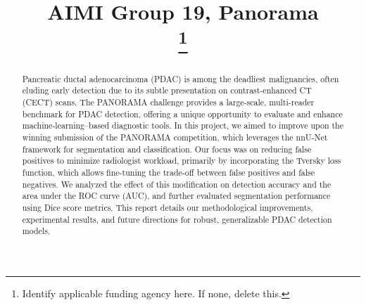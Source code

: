 \documentclass[conference]{IEEEtran}
\begin{document}
\title{AIMI Group 19, Panorama\\
\thanks{Identify applicable funding agency here. If none, delete this.}
}

\author{
\and
{}
\and
{}
\and
{}
}

\maketitle

\begin{abstract}
Pancreatic ductal adenocarcinoma (PDAC) is among the deadliest malignancies, often eluding early detection due to its subtle presentation on contrast-enhanced CT (CECT) scans. The PANORAMA challenge provides a large-scale, multi-reader benchmark for PDAC detection, offering a unique opportunity to evaluate and enhance machine-learning–based diagnostic tools. In this project, we aimed to improve upon the winning submission of the PANORAMA competition, which leverages the nnU-Net framework for segmentation and classification. Our focus was on reducing false positives to minimize radiologist workload, primarily by incorporating the Tversky loss function, which allows fine-tuning the trade-off between false positives and false negatives. We analyzed the effect of this modification on detection accuracy and the area under the ROC curve (AUC), and further evaluated segmentation performance using Dice score metrics. This report details our methodological improvements, experimental results, and future directions for robust, generalizable PDAC detection models.

\end{abstract}
\end{document}

